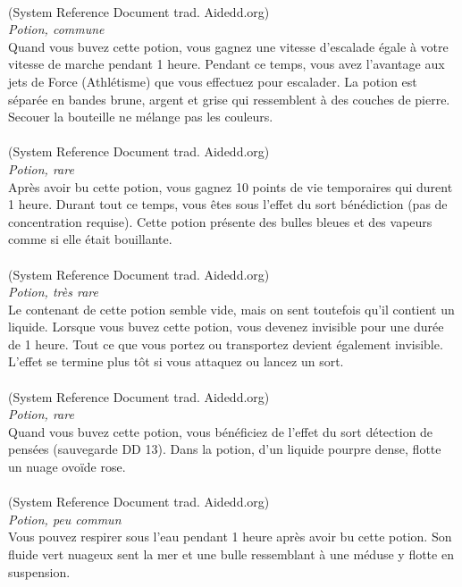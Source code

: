 \\
{\small (System Reference Document trad. Aidedd.org)}\\
{\small \it Potion, commune}\\
Quand vous buvez cette potion, vous gagnez une vitesse d'escalade égale à votre vitesse de marche pendant 1 heure. Pendant ce temps, vous avez l'avantage aux jets de Force (Athlétisme) que vous effectuez pour escalader. La potion est séparée en bandes brune, argent et grise qui ressemblent à des couches de pierre. Secouer la bouteille ne mélange pas les couleurs. \\

\\
{\small (System Reference Document trad. Aidedd.org)}\\
{\small \it Potion, rare}\\
Après avoir bu cette potion, vous gagnez 10 points de vie temporaires qui durent 1 heure. Durant tout ce temps, vous êtes sous l'effet du sort bénédiction (pas de concentration requise). Cette potion présente des bulles bleues et des vapeurs comme si elle était bouillante. \\

\\
{\small (System Reference Document trad. Aidedd.org)}\\
{\small \it Potion, très rare}\\
Le contenant de cette potion semble vide, mais on sent toutefois qu'il contient un liquide. Lorsque vous buvez cette potion, vous devenez invisible pour une durée de 1 heure. Tout ce que vous portez ou transportez devient également invisible. L'effet se termine plus tôt si vous attaquez ou lancez un sort. \\

\\
{\small (System Reference Document trad. Aidedd.org)}\\
{\small \it Potion, rare}\\
Quand vous buvez cette potion, vous bénéficiez de l'effet du sort détection de pensées (sauvegarde DD 13). Dans la potion, d'un liquide pourpre dense, flotte un nuage ovoïde rose. \\

\\
{\small (System Reference Document trad. Aidedd.org)}\\
{\small \it Potion, peu commun}\\
Vous pouvez respirer sous l'eau pendant 1 heure après avoir bu cette potion. Son fluide vert nuageux sent la mer et une bulle ressemblant à une méduse y flotte en suspension. \\

